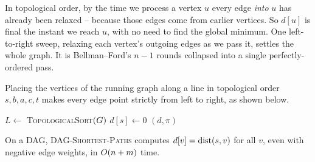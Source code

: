 \begin{intuitionbox}
In topological order, by the time we process a vertex $u$ every edge \emph{into} $u$ has
already been relaxed -- because those edges come from earlier vertices. So $d[u]$ is final
the instant we reach $u$, with no need to find the global minimum. One left-to-right sweep,
relaxing each vertex's outgoing edges as we pass it, settles the whole graph. It is
Bellman--Ford's $n-1$ rounds collapsed into a single perfectly-ordered pass.
\end{intuitionbox}

Placing the vertices of the running graph along a line in topological order $s,b,a,c,t$ makes every edge point strictly from left to right, as shown below.

\begin{center}
\end{center}

\begin{algorithm}[H]
\DontPrintSemicolon
\caption{\textsc{DAG-Shortest-Paths}$(\Gph,w,s)$}
$L\gets$ \textsc{TopologicalSort}$(G)$ 
 \quad $d[s]\gets 0$\;
\Return $(d,\pi)$\;
\end{algorithm}

\begin{theorem}
\label{ch07:dag-correct}
On a DAG, \textsc{DAG-Shortest-Paths} computes $d[v]=\operatorname{dist}(s,v)$ for all $v$, even with
negative edge weights, in $O(n+m)$ time.
\end{theorem}

